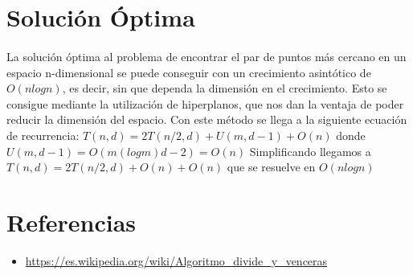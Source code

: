 \documentclass{article}
\begin{document}
\section{Solución Óptima}
	\paragraph{}
	La solución óptima al problema de encontrar el par de puntos más cercano en un espacio n-dimensional se puede conseguir con un crecimiento asintótico de $O(nlogn)$, es decir, sin que dependa la dimensión en el crecimiento. Esto se consigue mediante la utilización de hiperplanos, que nos dan la ventaja de poder reducir la dimensión del espacio. Con este método se llega a la siguiente ecuación de recurrencia:
	$T(n, d) = 2T(n/2, d) + U(m, d - 1) + O(n)$ donde $U(m, d-1)=O(m (logm) d - 2) = O(n)$
	Simplificando llegamos a $T(n,d)=2T(n/2,d)+O(n)+O(n)$ que se resuelve en $O(nlogn)$ 

\section{Referencias}

	\begin{itemize}
		\item \url{https://es.wikipedia.org/wiki/Algoritmo_divide_y_venceras}	
	\end{itemize}
\end{document}

